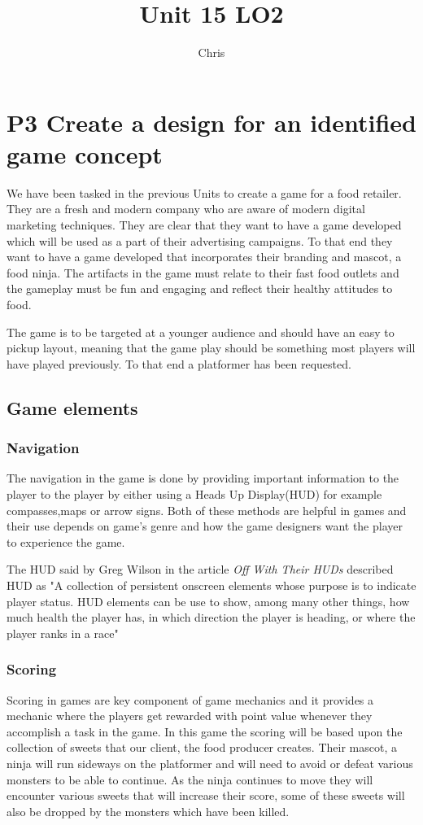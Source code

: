 \documentclass{article}
\title{Unit 15 LO2}
\author{Chris}
\date{}
\begin{document}
\maketitle
\tableofcontents
\break

\section{P3 Create a design for an identified game concept}
We have been tasked in the previous Units to create a game for a food retailer. They are a fresh and modern company who are aware of modern digital marketing techniques.
They are clear that they want to have a game developed which will be used as a part of their advertising campaigns. To that end they want to have a game developed that incorporates their branding and mascot, a food ninja.
The artifacts in the game must relate to their fast food outlets and the gameplay must be fun and engaging and reflect their healthy attitudes to food. 

The game is to be targeted at a younger audience and should have an easy to pickup layout, meaning that the game play should be something most players will have played previously. To that end a platformer has been requested. 

\subsection{Game elements}
\subsubsection{Navigation}
The navigation in the game is done by providing important information to the player to the player by either using a Heads Up Display(HUD) for example compasses,maps or arrow signs. Both of these methods are helpful in games and their use depends on game's genre and how the game designers want the player to experience the game.

The HUD said by Greg Wilson in the article \textit{Off With Their HUDs} described HUD as "A collection of persistent onscreen elements whose purpose is to indicate player status. HUD elements can be use to show, among many other things, how much health the player has, in which direction the player is heading, or where the player ranks in a race" 



\subsubsection{Scoring}
Scoring in games are key component of game mechanics and it provides a mechanic where the players get rewarded with point value whenever they accomplish a task in the game.   
In this game the scoring will be based upon the collection of sweets that our client, the food producer creates. Their mascot, a ninja will run sideways on the platformer and will need to avoid or defeat various monsters to be able to continue. As the ninja continues to move they will encounter various sweets that will increase their score, some of these sweets will also be dropped by the monsters which have been killed.
\end{document}
